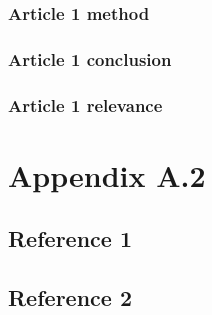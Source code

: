 \documentclass[a4paper]{article}
\begin{document}
  \subsubsection{Article 1 method}
  \subsubsection{Article 1 conclusion}
  \subsubsection{Article 1 relevance}
  \clearpage
  

  \section{Appendix A.2} %
  \subsection{Reference 1}
  \subsection{Reference 2}
  \clearpage
\end{document}
